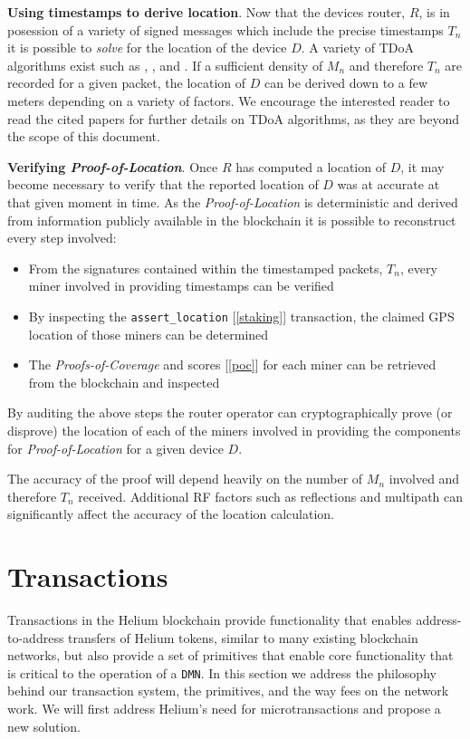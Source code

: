 \documentclass[10pt, nonatbib, nocopyrightspace, reprint]{sigplanconf}
\newcommand{\secref}[1]{[\autoref{#1}]}
\begin{document}
\textbf{Using timestamps to derive location}. Now that the devices router, $R$, is in posession of a variety of signed messages which include the precise timestamps $T_n$ it is possible to \emph{solve} for the location of the device $D$. A variety of TDoA algorithms exist such as \cite{recurrent-tdoa}, \cite{acoustic-tdoa}, \cite{efficient-tdoa} and \cite{async-tdoa}. If a sufficient density of $M_n$ and therefore $T_n$ are recorded for a given packet, the location of $D$ can be derived down to a few meters depending on a variety of factors. We encourage the interested reader to read the cited papers for further details on TDoA algorithms, as they are beyond the scope of this document.

\textbf{Verifying \emph{Proof-of-Location}}. Once $R$ has computed a location of $D$, it may become necessary to verify that the reported location of $D$ was at accurate at that given moment in time. As the \emph{Proof-of-Location} is deterministic and derived from information publicly available in the blockchain it is possible to reconstruct every step involved:

\begin{itemize}
  \item From the signatures contained within the timestamped packets, $T_n$, every miner involved in providing timestamps can be verified
  \item By inspecting the \verb|assert_location| \secref{staking} transaction, the claimed GPS location of those miners can be determined
  \item The \emph{Proofs-of-Coverage} and scores \secref{poc} for each miner can be retrieved from the blockchain and inspected
\end{itemize}

By auditing the above steps the router operator can cryptographically prove (or disprove) the location of each of the miners involved in providing the components for \emph{Proof-of-Location} for a given device $D$. 

The accuracy of the proof will depend heavily on the number of $M_n$ involved and therefore $T_n$ received. Additional RF factors such as reflections and multipath can significantly affect the accuracy of the location calculation.

\section{Transactions}\label{transactions}

Transactions in the Helium blockchain provide functionality that enables address-to-address transfers of Helium tokens, similar to many existing blockchain networks, but also provide a set of primitives that enable core functionality that is critical to the operation of a \verb|DMN|. In this section we address the philosophy behind our transaction system, the primitives, and the way fees on the network work. We will first address Helium's need for microtransactions and propose a new solution.
\end{document}
